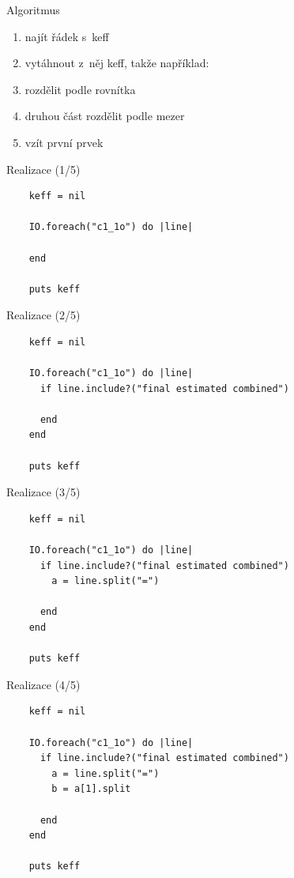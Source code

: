 \documentclass{beamer}
\begin{document}
\begin{frame}{Algoritmus}
  \begin{enumerate}
    \item najít řádek s~keff
    \pause
    \item vytáhnout z~něj keff, takže například:
    \pause
    \item rozdělit podle rovnítka
    \pause
    \item druhou část rozdělit podle mezer
    \pause
    \item vzít první prvek
  \end{enumerate}
\end{frame}


\begin{frame}[fragile]{Realizace (1/5)}
  \scriptsize
  \begin{verbatim}
    keff = nil

    IO.foreach("c1_1o") do |line|

    end

    puts keff
  \end{verbatim}
\end{frame}

\begin{frame}[fragile]{Realizace (2/5)}
  \scriptsize
  \begin{verbatim}
    keff = nil

    IO.foreach("c1_1o") do |line|
      if line.include?("final estimated combined")

      end
    end

    puts keff
  \end{verbatim}
\end{frame}

\begin{frame}[fragile]{Realizace (3/5)}
  \scriptsize
  \begin{verbatim}
    keff = nil

    IO.foreach("c1_1o") do |line|
      if line.include?("final estimated combined")
        a = line.split("=")

      end
    end

    puts keff
  \end{verbatim}
\end{frame}

\begin{frame}[fragile]{Realizace (4/5)}
  \scriptsize
  \begin{verbatim}
    keff = nil

    IO.foreach("c1_1o") do |line|
      if line.include?("final estimated combined")
        a = line.split("=")
        b = a[1].split

      end
    end

    puts keff
  \end{verbatim}
\end{frame}
\end{document}
